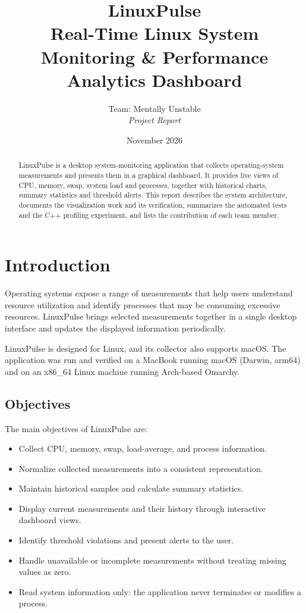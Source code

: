 \documentclass[11pt,a4paper]{article}
\title{\textbf{LinuxPulse}\\
\large Real-Time Linux System Monitoring \& Performance Analytics Dashboard}
\author{Team: Mentally Unstable\\[0.4em]
\textit{Project Report}}
\date{November 2026}
\begin{document}
\maketitle

\begin{abstract}
LinuxPulse is a desktop system-monitoring application that collects operating-system
measurements and presents them in a graphical dashboard. It provides live views of
CPU, memory, swap, system load and processes, together with historical charts,
summary statistics and threshold alerts. This report describes the system
architecture, documents the visualization work and its verification, summarizes
the automated tests and the C++ profiling experiment, and lists the contribution
of each team member.
\end{abstract}

\newpage

\tableofcontents
\newpage

\section{Introduction}

Operating systems expose a range of measurements that help users understand
resource utilization and identify processes that may be consuming excessive
resources. LinuxPulse brings selected measurements together in a single desktop
interface and updates the displayed information periodically.

LinuxPulse is designed for Linux, and its collector also supports macOS. The
application was run and verified on a MacBook running macOS (Darwin, arm64) and on
an x86\_64 Linux machine running Arch-based Omarchy.

\subsection{Objectives}

The main objectives of LinuxPulse are:
\begin{itemize}
    \item Collect CPU, memory, swap, load-average, and process information.
    \item Normalize collected measurements into a consistent representation.
    \item Maintain historical samples and calculate summary statistics.
    \item Display current measurements and their history through interactive
          dashboard views.
    \item Identify threshold violations and present alerts to the user.
    \item Handle unavailable or incomplete measurements without treating
          missing values as zero.
    \item Read system information only: the application never terminates or
          modifies a process.
\end{itemize}
\end{document}
